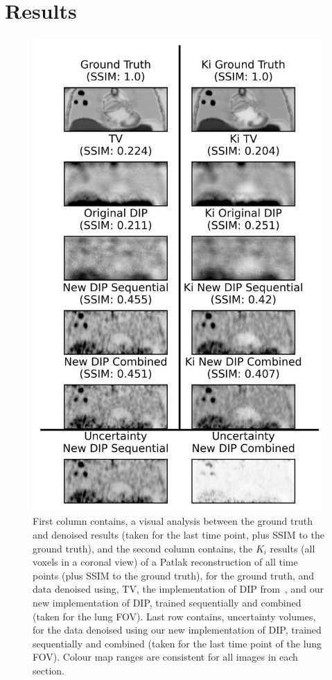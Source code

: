     \section{Results} \label{sec:pseudo_bayesian_dip_denoising_as_a_preprocessing_step_for_kinetic_modelling_in_dynamic_pet_appendix_results}
        \begin{figure}
            \centering
            
            \includegraphics[width=0.7\linewidth]{figures/deep_image_prior_results_visual_analysis.png}
            
            \captionsetup{singlelinecheck=false, justification=centering}
            \caption{
                First column contains, a visual analysis between the ground truth and denoised results (taken for the last time point, plus \gls{SSIM} to the ground truth), and the second column contains, the $K_i$ results (all voxels in a coronal view) of a Patlak reconstruction of all time points (plus \gls{SSIM} to the ground truth), for the ground truth, and data denoised using, \gls{TV}, the implementation of \gls{DIP} from~\parencite{Gong2019PETPrior}, and our new implementation of \gls{DIP}, trained sequentially and combined (taken for the lung \gls{FOV}). Last row contains, uncertainty volumes, for the data denoised using our new implementation of \gls{DIP}, trained sequentially and combined (taken for the last time point of the lung \gls{FOV}). Colour map ranges are consistent for all images in each section.
            }
            \label{fig:pseudo_bayesian_dip_denoising_as_a_preprocessing_step_for_kinetic_modelling_in_dynamic_pet_appendix_results_visual_analysis}
        \end{figure}
        
